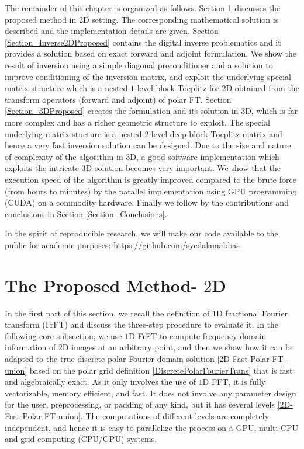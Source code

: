 \documentclass{UCF_ETD}
\begin{document}
 The remainder of this chapter is organized as follows. Section \ref{Section_2DProposed} discusses the proposed method in $2$D setting. The corresponding mathematical solution is described and the implementation details are given. Section \ref{Section_Inverse2DProposed} contains the digital inverse problematics and it provides a solution based on exact forward and adjoint formulation. We show the result of inversion using a simple diagonal preconditioner and a solution to improve conditioning of the inversion matrix, and exploit the underlying special matrix structure which is a nested $1$-level block Toeplitz for $2$D obtained from the transform operators (forward and adjoint) of polar FT. Section \ref{Section_3DProposed} creates the formulation and its solution in $3$D, which is far more complex and has a richer geometric structure to exploit. The special underlying matrix stucture is a nested $2$-level deep block Toeplitz matrix and hence a very fast inversion solution can be designed. Due to the size and nature of complexity of the algorithm in $3$D, a good software implementation which exploits the intricate $3$D solution becomes very important. We show that the execution speed of the algorithm is greatly improved compared to the brute force (from hours to minutes) by the parallel implementation using GPU programming (CUDA) on a commodity hardware.
 Finally we follow by the contributions and conclusions in Section \ref{Section_Conclusions}.
 
   In the spirit of reproducible research,  we will  make our code available to the public for academic purposes:  https://github.com/syedalamabbas
 
 \section{The Proposed Method- $2$D} \label{Section_2DProposed}
 In the first part of this section, we recall the definition of $1$D fractional Fourier transform (FrFT)   and
 discuss the three-step procedure to evaluate it.
 In the following core subsection,  we use $1$D FrFT to compute
 frequency domain information of $2$D images at an arbitrary
 point, and then we show how it can be adapted to the true discrete polar Fourier domain solution
 \eqref{2D-Fast-Polar-FT-union} based on the polar grid definition \eqref{DiscretePolarFourierTrans} that is fast and algebraically exact.
 As it only involves the use of $1$D FFT, it is fully vectorizable, memory efficient, and fast. It does not involve any parameter design  for the user,  preprocessing, %
 or padding of any kind, but it has several levels \eqref{2D-Fast-Polar-FT-union}. The computations of different levels are completely independent, and hence it is easy to parallelize the process on a GPU, multi-CPU %
 and grid computing (CPU/GPU) systems.
 
\end{document}
